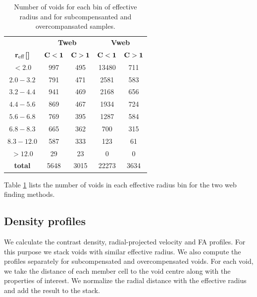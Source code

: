 \documentclass[a4,useAMS,usenatbib,usegraphicx]{mn2e}
\newcommand{\hMpc}{{\ifmmode{h^{-1}{\rm Mpc}}\else{$h^{-1}$Mpc}\fi}}
\begin{document}
\begin{table}[!htbp]
\centering
\begin{tabular}{c | c c | c c}
\toprule
\multicolumn{1}{c}{}&  \multicolumn{2}{c}{\textbf{Tweb}} & \multicolumn{2}{c}{\textbf{Vweb}}\\
\textbf{${\bf r_{\rm eff}}$[\hMpc]}   & $\bf{C<1}$   & $\bf{C>1}$    & $\bf{C<1}$   & $\bf{C>1}$\\ \hline
$<2.0$        &  997 & 495   & 13480  & 711\\
$2.0-3.2$     &  791 & 471   & 2581   & 583\\
$3.2-4.4$     &  941 & 469   & 2168   & 656\\
$4.4-5.6$     &  869 & 467   & 1934   & 724\\
$5.6-6.8$     &  769 & 395   & 1287   & 584\\
$6.8-8.3$     &  665 & 362   & 700    & 315\\
$8.3-12.0$    &  587 & 333   & 123    & 61\\
$>12.0$       &  29  & 23    & 0      & 0\\ \hline
\textbf{total}& 5648 & 3015  & 22273  & 3634\\
\bottomrule
\end{tabular}
\caption{Number of voids for each bin of effective radius and for 
subcompensanted and overcompansated samples.}
\label{tab:number_voids}
\end{table}

Table \ref{tab:number_voids} lists the number of voids in 
each effective radius bin for the two web finding methods.


\subsection{Density profiles}
\label{subsec:density_voids}


We calculate the contrast density, radial-projected velocity and 
FA profiles. 
For this purpose we stack voids with similar effective radius.
We also compute the profiles separately  for subcompensated and
overcompensated voids. 
For each void,  
we take the distance of each member cell to the void centre along with the 
properties of interest. 
We normalize the radial distance with the effective radius and add the
result to the stack.
\end{document}
